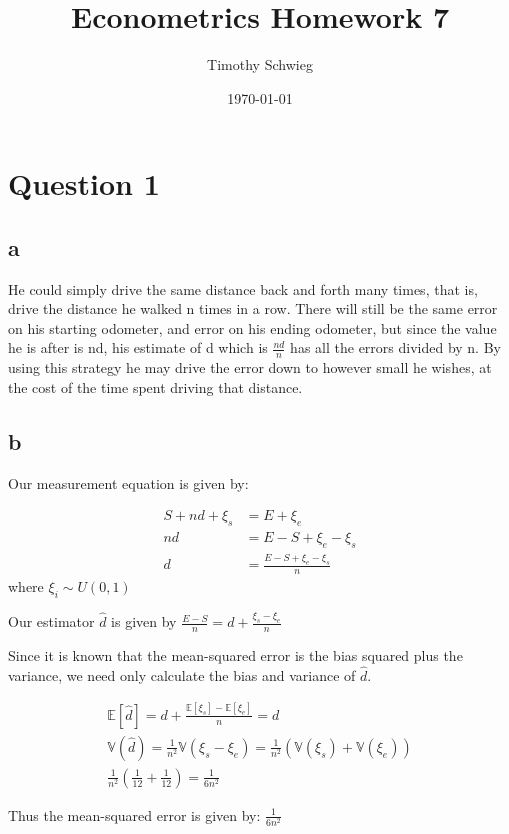 \documentclass[11pt]{article}\usepackage[]{graphicx}\usepackage[]{color}
\author{Timothy Schwieg}
\date{\today}
\title{Econometrics Homework 7}
\begin{document}
\maketitle


\section{Question 1}
\label{sec-1}
\subsection{a}
\label{sec-1-1}
He could simply drive the same distance back and forth many times,
that is, drive the distance he walked n times in a row. There will
still be the same error on his starting odometer, and error on his
ending odometer, but since the value he is after is nd, his estimate
of d which is $\frac{nd}{n}$ has all the errors divided by n. By using
this strategy he may drive the error down to however small he wishes,
at the cost of the time spent driving that distance.

\subsection{b}
\label{sec-1-2}
Our measurement equation is given by:

\begin{align*}
S + nd + \xi_s &= E + \xi_e \\
nd &= E - S + \xi_e - \xi_s \\
d &= \frac{ E - S + \xi_e -\xi_s}{n}
\end{align*}
where $\xi_i \sim U(0,1)$

Our estimator $\hat{d}$ is given by $\frac{E - S}{n} = d + \frac{ \xi_s - \xi_e }{n}$

Since it is known that the mean-squared error is the bias squared plus
the variance, we need only calculate the bias and variance of $\hat{d}$.

\begin{align*} 
\mathbb{E}[ \hat{d} ] = d + \frac{ \mathbb{E}[\xi_s ] - \mathbb{E}[\xi_e ] }{n} = d \\
\mathbb{V} ( \hat{d} ) = \frac{1}{n^2} \mathbb{V}( \xi_s - \xi_e ) = \frac{1}{n^2} \left ( \mathbb{V}(\xi_s) + \mathbb{V}(\xi_e) \right ) \\
\frac{1}{n^2} \left ( \frac{1}{12} + \frac{1}{12} \right )  = \frac{ 1 }{6n^2}
\end{align*}

Thus the mean-squared error is given by: $\frac{1}{6n^2}$
\end{document}
